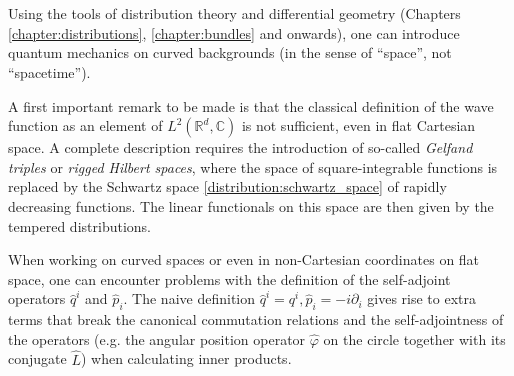\section{}

    Using the tools of distribution theory and differential geometry (Chapters \ref{chapter:distributions}, \ref{chapter:bundles} and onwards), one can introduce quantum mechanics on curved backgrounds (in the sense of ``space'', not ``spacetime'').

    \begin{remark}
        A first important remark to be made is that the classical definition of the wave function as an element of $L^2(\mathbb{R}^d,\mathbb{C})$ is not sufficient, even in flat Cartesian space. A complete description requires the introduction of so-called \textit{Gelfand triples} or \textit{rigged Hilbert spaces}, where the space of square-integrable functions is replaced by the Schwartz space \ref{distribution:schwartz_space} of rapidly decreasing functions. The linear functionals on this space are then given by the tempered distributions.
    \end{remark}

    When working on curved spaces or even in non-Cartesian coordinates on flat space, one can encounter problems with the definition of the self-adjoint operators $\hat{q}^i$ and $\hat{p}_i$. The naive definition $\hat{q}^i = q^i,\hat{p}_i = -i\partial_i$ gives rise to extra terms that break the canonical commutation relations and the self-adjointness of the operators (e.g. the angular position operator $\hat{\varphi}$ on the circle together with its conjugate $\hat{L}$) when calculating inner products.

